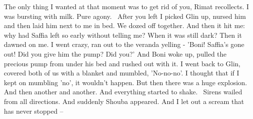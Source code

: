 \documentclass[letterpaper]{article}
\begin{document}
{\textquotedbl}The only thing I wanted{ }at that moment was to get rid of
you,{\textquotedbl} Rimat recollects. {\textquotedbl}I was bursting with milk. Pure agony. ~After you left I picked
Glin up, nursed{ }him and then laid him next to me in bed. We dozed off together. And then it hit me:
why had Saffia left so early without telling me? When it was still dark? Then it dawned{ }on me. I went
crazy, ran out to the veranda yelling - 'Boni! Saffia's gone out! Did you give him the pump? Did you?' And Boni woke
up, pulled the precious pump from under his bed and rushed out with it. I went back to Glin, covered both of us with a
blanket and mumbled, 'No-no-no'. I thought that if I kept on mumbling 'no', it wouldn't happen. But then there was a
huge explosion. And then another and another. And everything started to shake. \ Sirens wailed from all directions. And
suddenly Shouba appeared. And I let out a scream that has never stopped --{\textquotedbl}
\end{document}
